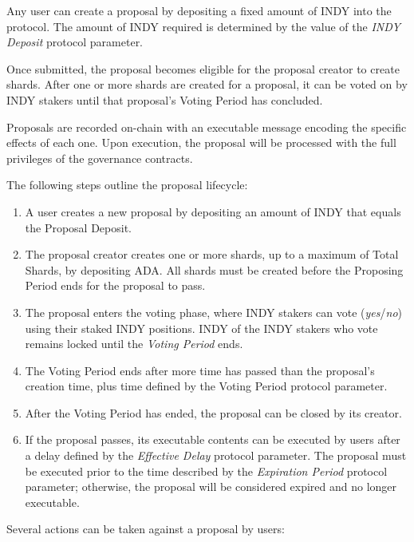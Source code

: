 \documentclass{article}
\begin{document}
\begin{sloppypar}
Any user can create a proposal by depositing a fixed amount of INDY into
the protocol. The amount of INDY required is determined by the value of
the \emph{INDY Deposit} protocol parameter.

Once submitted, the proposal becomes eligible for the proposal creator
to create shards. After one or more shards are created for a proposal,
it can be voted on by INDY stakers until that proposal's Voting Period
has concluded.

Proposals are recorded on-chain with an executable message encoding the
specific effects of each one. Upon execution, the proposal will be
processed with the full privileges of the governance contracts.

The following steps outline the proposal lifecycle:

\begin{enumerate}
\item
  A user creates a new proposal by depositing an amount of INDY that
  equals the Proposal Deposit.
\item
  The proposal creator creates one or more shards, up to a maximum of
  Total Shards, by depositing ADA. All shards must be created before the
  Proposing Period ends for the proposal to pass.
\item
  The proposal enters the voting phase, where INDY stakers can vote
  (\emph{yes}/\emph{no}) using their staked INDY positions. INDY of the
  INDY stakers who vote remains locked until the \emph{Voting Period}
  ends.
\item
  The Voting Period ends after more time has passed than the proposal's
  creation time, plus time defined by the Voting Period protocol
  parameter.
\item
  After the Voting Period has ended, the proposal can be closed by its
  creator.
\item
  If the proposal passes, its executable contents can be executed by
  users after a delay defined by the \emph{Effective Delay} protocol
  parameter. The proposal must be executed prior to the time described
  by the \emph{Expiration Period} protocol parameter; otherwise, the
  proposal will be considered expired and no longer executable.
\end{enumerate}

Several actions can be taken against a proposal by users:


\end{sloppypar}
\end{document}
